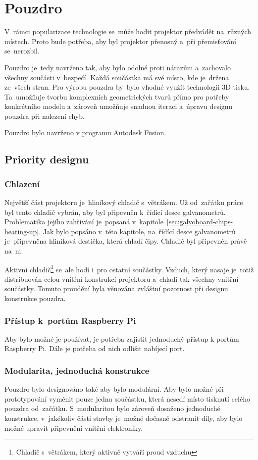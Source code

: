 \section{Pouzdro}

V~rámci popularizace technologie se~může hodit projektor předvádět na~různých místech. Proto bude potřeba, aby byl projektor přenosný a~při přemisťování se~nerozbil.

Pouzdro je~tedy navrženo tak, aby bylo odolné proti nárazům a~zachovalo všechny součásti v~bezpečí. Každá součástka má své místo, kde je~držena ze~všech stran. Pro výrobu pouzdra by~bylo vhodné využít technologii 3D tisku. Ta~umožňuje tvorbu komplexních geometrických tvarů přímo pro potřeby konkrétního modelu a~zároveň umožňuje snadnou iteraci a~úpravu designu pouzdra při nalezení chyb.

Pouzdro bylo navrženo v programu Autodesk Fusion.

\subsection{Priority designu} \label{sec:krabick-design-priorities}
\subsubsection{Chlazení}
Největší část projektoru je~hliníkový chladič s~větrákem. Už od~začátku práce byl tento chladič vybrán, aby byl připevněn k~řídící desce galvanometrů. Problematika jejího zahřívání je~popsaná v~kapitole~\ref{sec:galvoboard-chips-heating-up}.
Jak bylo popsáno v~této kapitole, na~řídící desce galvanometrů je~připevněna hliníková destička, která chladí čipy. Chladič byl připevněn právě na~ni.

Aktivní chladič\footnote{Chladič s~větrákem, který aktivně vytváří proud vzduchu} se~ale hodí i~pro ostatní součástky. Vzduch, který nasaje je~totiž distribuován celou vnitřní konstrukcí projektoru a~chladí tak všechny vnitřní součástky. Tomuto proudění byla věnována zvláštní pozornost při designu konstrukce pouzdra.

\subsubsection{Přístup k~portům Raspberry Pi}
Aby bylo možné je používat, je potřeba zajistit jednoduchý přístup k portům Raspberry Pi. Dále je potřeba od nich odlišit nabíjecí port.

\subsubsection{Modularita, jednoduchá konstrukce}
Pouzdro bylo designováno také aby bylo modulární. Aby bylo možné při prototypování vyměnit pouze jednu součástku, která nesedí místo tisknutí celého pouzdra od~začátku. S~modularitou bylo zároveň dosaženo jednoduché konstrukce, v~jakékoliv části stavby je~možné dočasně odstranit díly, aby bylo možné upravit připevnění vnitřní elektroniky.

